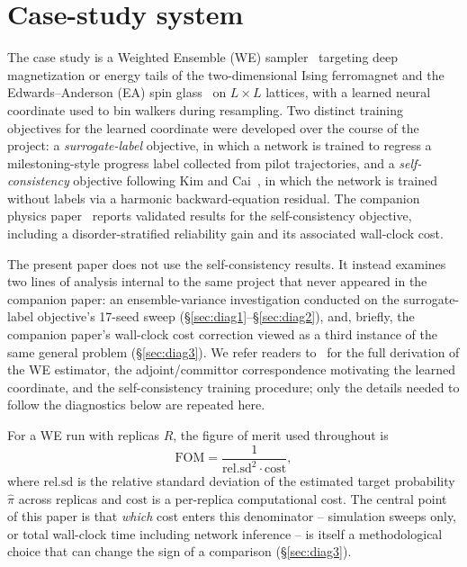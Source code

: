 \documentclass[a4paper,fleqn]{cas-sc}
\newcommand{\FOM}{\mathrm{FOM}}
\begin{document}
\section{Case-study system}\label{sec:system}

The case study is a Weighted Ensemble (WE) sampler~\citep{huber1996,
zhang2010,zuckerman2017} targeting deep magnetization or energy tails of the
two-dimensional Ising ferromagnet and the Edwards--Anderson (EA) spin
glass~\citep{ising1925,edwards1975} on $L\times L$ lattices, with a learned
neural coordinate used to bin walkers during resampling. Two distinct
training objectives for the learned coordinate were developed over the
course of the project: a \emph{surrogate-label} objective, in which a
network is trained to regress a milestoning-style progress label collected
from pilot trajectories, and a \emph{self-consistency} objective following
Kim and Cai~\citep{kimcai2026}, in which the network is trained without
labels via a harmonic backward-equation residual. The companion physics
paper~\citep{alzaatreh2026} reports validated results for the
self-consistency objective, including a disorder-stratified reliability gain
and its associated wall-clock cost.

The present paper does not use the self-consistency results. It instead
examines two lines of analysis internal to the same project that never
appeared in the companion paper: an ensemble-variance investigation
conducted on the surrogate-label objective's 17-seed sweep
(\S\ref{sec:diag1}--\S\ref{sec:diag2}), and, briefly, the companion paper's
wall-clock cost correction viewed as a third instance of the same general
problem (\S\ref{sec:diag3}). We refer readers to~\citep{alzaatreh2026} for
the full derivation of the WE estimator, the adjoint/committor
correspondence motivating the learned coordinate, and the self-consistency
training procedure; only the details needed to follow the diagnostics below
are repeated here.

For a WE run with replicas $R$, the figure of merit used throughout is
\begin{equation}
\FOM = \frac{1}{\mathrm{rel.sd}^2 \cdot \mathrm{cost}},
\end{equation}
where $\mathrm{rel.sd}$ is the relative standard deviation of the estimated
target probability $\hat\pi$ across replicas and $\mathrm{cost}$ is a
per-replica computational cost. The central point of this paper is that
\emph{which} cost enters this denominator -- simulation sweeps only, or
total wall-clock time including network inference -- is itself a
methodological choice that can change the sign of a comparison
(\S\ref{sec:diag3}).
\end{document}
